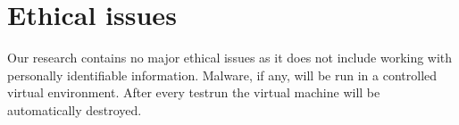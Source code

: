 \documentclass{scrartcl}
\begin{document}
\section{Ethical issues}

Our research contains no major ethical issues as it does not include working with personally identifiable information. Malware, if any, will be run in a controlled virtual environment. After every testrun the virtual machine will be automatically destroyed.




\end{document}
